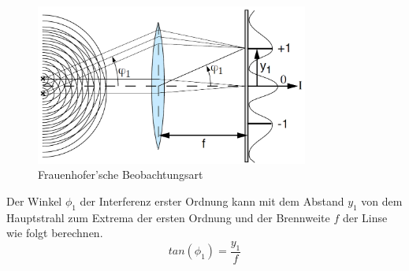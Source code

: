 \begin{figure}[h!]
	\centering
	\includegraphics[width=0.8\textwidth]{data/fraunhofer}
	\caption{Frauenhofer'sche Beobachtungsart}
	\label{fig:beobachtungsart}
\end{figure}

Der Winkel $ \phi_{1} $ der Interferenz erster Ordnung kann mit dem Abstand $ y_{1} $ von dem Hauptstrahl zum Extrema der ersten Ordnung und der Brennweite $ f $ der Linse wie folgt berechnen.
\begin{equation}\label{eq:frauenhofer}
tan(\phi_{1}) =  \frac{y_{1}}{f}
\end{equation}
